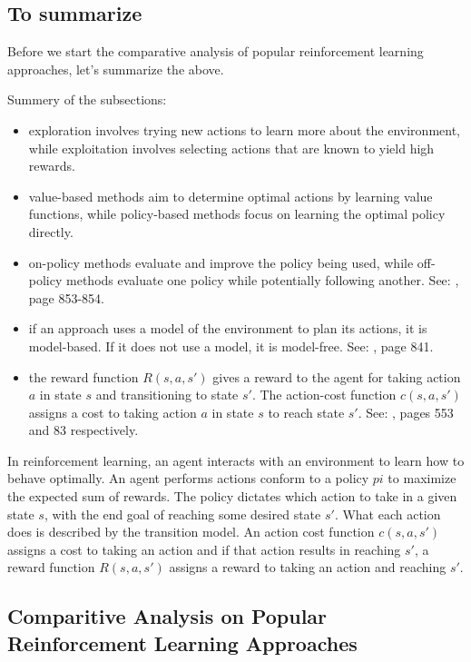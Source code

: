 \subsection{To summarize}

Before we start the comparative analysis of popular reinforcement learning approaches, let's summarize the above.

Summery of the subsections:
\begin{itemize}
    \item exploration involves trying new actions to learn more about the environment, while exploitation involves selecting actions that are known to yield high rewards.
    \item value-based methods aim to determine optimal actions by learning value functions, while \gls{policy}-based methods focus on learning the optimal \gls{policy} directly.
    \item on-\gls{policy} methods evaluate and improve the \gls{policy} being used, while off-\gls{policy} methods evaluate one \gls{policy} while potentially following another. See: \cite{rn2022aima}, page 853-854.
    \item if an approach uses a model of the environment to plan its actions, it is model-based. If it does not use a model, it is model-free. See: \cite{rn2022aima}, page 841.
    \item the \gls{reward function} $R(s, a, s')$ gives a reward to the \gls{agent} for taking action $a$ in state $s$ and transitioning to state $s'$. The \gls{action-cost function} $c(s, a, s')$ assigns a cost to taking action $a$ in state $s$ to reach state $s'$. See: \cite{rn2022aima}, pages 553 and 83 respectively.
\end{itemize}

In reinforcement learning, an agent interacts with an environment to learn how to behave optimally.
An agent performs actions conform to a \gls{policy} $pi$ to maximize the expected sum of rewards. 
The \gls{policy} dictates which action to take in a given state $s$, with the end goal of reaching some desired state $s'$.
What each action does is described by the \gls{transition model}.
An action cost function $c(s, a, s')$ assigns a cost to taking an action and if that action results in reaching $s'$, a \gls{reward function} $R(s, a, s')$ assigns a reward to taking an action and reaching $s'$.

\subsection{Comparitive Analysis on Popular Reinforcement Learning Approaches}

